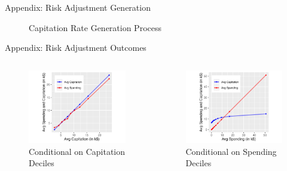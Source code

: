 \documentclass[professionalfonts, aspectratio=169]{beamer}
\begin{document}
\begin{frame}{Appendix: Risk Adjustment Generation}
  \begin{figure}
    \centering
    
    \caption{Capitation Rate Generation Process}
  \end{figure}
\end{frame}

\begin{frame}{Appendix: Risk Adjustment Outcomes}
  \begin{columns}
    \begin{column}{0.5\textwidth}
      \begin{figure}
        \centering
        \includegraphics[width=1\textwidth]{figures/images/avg_spending_vs_capitation_by_capitation_deciles.png}
        \caption{Conditional on Capitation Deciles}
      \end{figure}
    \end{column}
    \begin{column}{0.5\textwidth}
      \begin{figure}
        \centering
        \includegraphics[width=1\textwidth]{figures/images/avg_spending_vs_capitation_by_spending_deciles.png}
        \caption{Conditional on Spending Deciles}
      \end{figure}
    \end{column}
    

\end{columns}
\end{frame}
\end{document}
